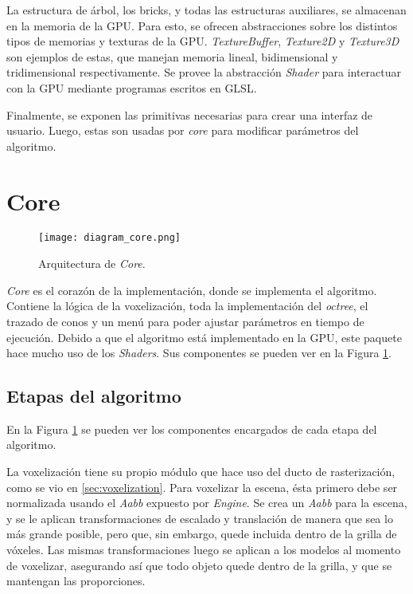 La estructura de árbol, los bricks, y todas las estructuras auxiliares, se almacenan en la memoria de la GPU.
Para esto, se ofrecen abstracciones sobre los distintos tipos de memorias y texturas de la GPU.
\textit{TextureBuffer}, \textit{Texture2D} y \textit{Texture3D} son ejemplos de estas, que manejan memoria lineal, bidimensional y tridimensional respectivamente.
Se provee la abstracción \textit{Shader} para interactuar con la GPU mediante programas escritos en GLSL.

Finalmente, se exponen las primitivas necesarias para crear una interfaz de usuario.
Luego, estas son usadas por \textit{core} para modificar parámetros del algoritmo.

\section{Core}

\begin{figure}[ht]
    \centering
    \texttt{[image: diagram\_core.png]}
    \caption{Arquitectura de \textit{Core}.}
    \label{fig:core_architecture}
\end{figure}

\textit{Core} es el corazón de la implementación, donde se implementa el algoritmo.
Contiene la lógica de la voxelización, toda la implementación del \textit{octree}, el trazado de conos y un menú para poder ajustar parámetros en tiempo de ejecución.
Debido a que el algoritmo está implementado en la GPU, este paquete hace mucho uso de los \textit{Shaders}.
Sus componentes se pueden ver en la Figura \ref{fig:core_architecture}.

\subsection{Etapas del algoritmo}

En la Figura \ref{fig:core_architecture} se pueden ver los componentes encargados de cada etapa del algoritmo.

La voxelización tiene su propio módulo que hace uso del ducto de rasterización, como se vio en \ref{sec:voxelization}.
Para voxelizar la escena, ésta primero debe ser normalizada usando el \textit{Aabb} expuesto por \textit{Engine}.
Se crea un \textit{Aabb} para la escena, y se le aplican transformaciones de escalado y translación de manera que sea lo más grande posible, pero que, sin embargo, quede incluida dentro de la grilla de vóxeles.
Las mismas transformaciones luego se aplican a los modelos al momento de voxelizar, asegurando así que todo objeto quede dentro de la grilla, y que se mantengan las proporciones.

